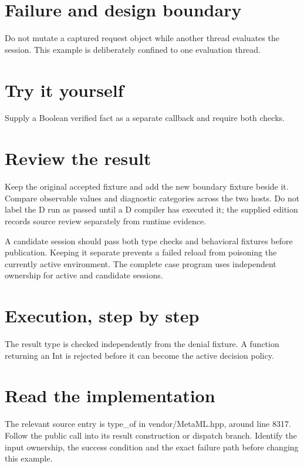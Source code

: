 
\section*{Failure and design boundary}
Do not mutate a captured request object while another thread evaluates the session. This example is deliberately confined to one evaluation thread.

\section*{Try it yourself}
Supply a Boolean verified fact as a separate callback and require both checks.

\section*{Review the result}
Keep the original accepted fixture and add the new boundary fixture beside it. Compare observable values and diagnostic categories across the two hosts. Do not label the D run as passed until a D compiler has executed it; the supplied edition records source review separately from runtime evidence.

\clearpage
{}
A candidate session should pass both type checks and behavioral fixtures before publication. Keeping it separate prevents a failed reload from poisoning the currently active environment. The complete case program uses independent ownership for active and candidate sessions.


\section*{Execution, step by step}
The result type is checked independently from the denial fixture. A function returning an Int is rejected before it can become the active decision policy.

\section*{Read the implementation}
The relevant source entry is type\_of in vendor/MetaML.hpp, around line 8317. Follow the public call into its result construction or dispatch branch. Identify the input ownership, the success condition and the exact failure path before changing this example.

